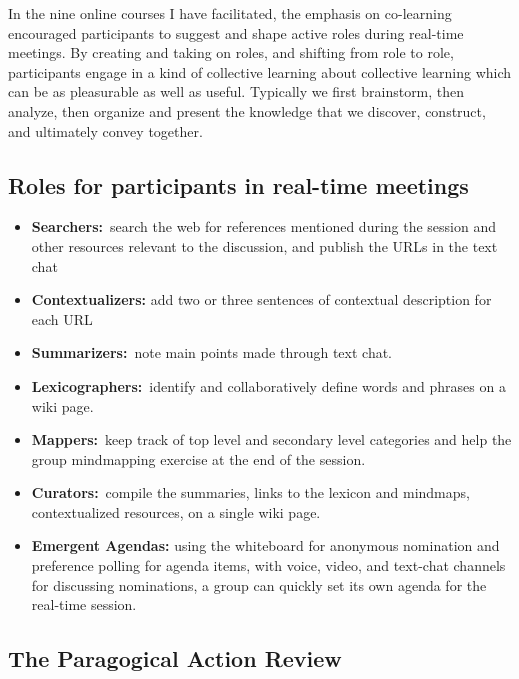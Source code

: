 In the nine online courses I have facilitated, the emphasis on
co-learning encouraged participants to suggest and shape active roles
during real-time meetings. By creating and taking on roles, and shifting
from role to role, participants engage in a kind of collective learning
about collective learning which can be as pleasurable as well as useful.
Typically we first brainstorm, then analyze, then organize and present
the knowledge that we discover, construct, and ultimately convey
together.

\hypertarget{roles-for-participants-in-real-time-meetings}{%
\subsection{Roles for participants in real-time
meetings}\label{roles-for-participants-in-real-time-meetings}}

\begin{itemize}
\tightlist
\item
  \textbf{Searchers:}~search the web for references mentioned during the
  session and other resources relevant to the discussion, and publish
  the URLs in the text chat
\item
  \textbf{Contextualizers:} add two or three sentences of contextual
  description for each URL
\item
  \textbf{Summarizers:}~note main points made through text chat.
\item
  \textbf{Lexicographers:}~identify and collaboratively define words and
  phrases on a wiki page.
\item
  \textbf{Mappers:}~keep track of top level and secondary level
  categories and help the group mindmapping exercise at the end of the
  session.
\item
  \textbf{Curators:}~compile the summaries, links to the lexicon and
  mindmaps, contextualized resources, on a single wiki page.
\item
  \textbf{Emergent Agendas:} using the whiteboard for anonymous
  nomination and preference polling for agenda items, with voice, video,
  and text-chat channels for discussing nominations, a group can quickly
  set its own agenda for the real-time session.
\end{itemize}

\hypertarget{the-paragogical-action-review}{%
\subsection{The Paragogical Action
Review}\label{the-paragogical-action-review}}

